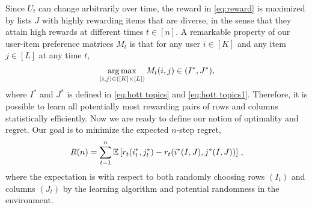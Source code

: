 Since $U_t$ can change arbitrarily over time, the reward in \eqref{eq:reward} is maximized by lists $J$ with highly rewarding items that are diverse, in the sense that they attain high rewards at different times $t \in [n]$. A remarkable property of our user-item preference matrices $M_t$ is that for any user $i \in [K]$ and any item $j \in [L]$ at any time $t$,
\begin{align*}
  \mathop{\rm arg\,max}_{(i, j) \in ([K] \times [L])} M_t(i, j) \in (I^\ast, J^\ast),
\end{align*}
where $I^\ast$ and $J^\ast$ is defined in \eqref{eq:hott topics} and \eqref{eq:hott topics1}. Therefore, it is possible to learn all potentially most rewarding pairs of rows and columns statistically efficiently. Now we are ready to define our notion of optimality and regret.  Our goal is to minimize the expected $n$-step regret,
\begin{align}
  R(n) =
  \sum_{t = 1}^n \mathbb{E}\left[r_t(i^\ast_t, j^\ast_t) - r_t(i^\ast(I,J),j^\ast(I,J))\right]\,,
  \label{eq:regret}
\end{align}
where the expectation is with respect to both randomly choosing rows $(I_t)$ and columns $(J_t)$ by the learning algorithm and potential randomness in the environment.


